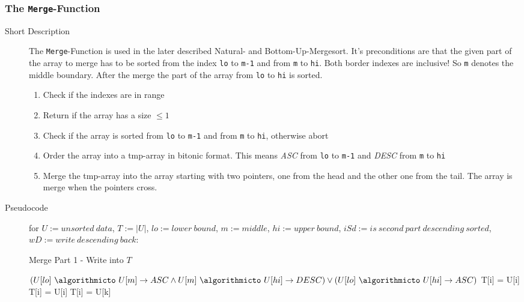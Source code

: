 \documentclass[11pt]{amsart}
\begin{document}
\subsubsection{The \texttt{Merge}-Function}
\begin{description}
	\item[Short Description] The \texttt{Merge}-Function is used in the later described Natural- and Bottom-Up-Mergesort. It's preconditions are that the given part of the array to merge has to be sorted from the index \texttt{lo} to \texttt{m-1} and from \texttt{m} to \texttt{hi}. Both border indexes are inclusive! So \texttt{m} denotes the middle boundary. After the merge the part of the array from \texttt{lo} to \texttt{hi} is sorted.
		\begin{enumerate}
			\item Check if the indexes are in range
			\item Return if the array has a size $\leq 1$
			\item Check if the array is sorted from \texttt{lo} to \texttt{m-1} and from \texttt{m} to \texttt{hi}, otherwise abort
			\item Order the array into a tmp-array in bitonic format. This means \textit{ASC} from \texttt{lo} to \texttt{m-1} and \textit{DESC} from \texttt{m} to \texttt{hi}
			\item Merge the tmp-array into the array starting with two pointers, one from the head and the other one from the tail. The array is merge when the pointers cross.
		\end{enumerate}
	\item[Pseudocode] for $U := unsorted~data$, $T := |U|$, $lo := lower~bound$, $m := middle$, $hi :=upper~bound$, $iSd := is~second~part~descending~sorted$, $wD := write~descending~back$:
	\begin{algorithm}
	\caption{Merge Part 1 - Write into $T$}
		\begin{algorithmic}[1]
		\Require $(U[lo]~\algorithmicto~U[m] \to ASC \land U[m]~\algorithmicto~U[hi] \to DESC) \lor (U[lo]~\algorithmicto~U[hi] \to ASC)$
				 \State T[i] = U[i] \EndFor
			\Else{}
				 \State T[i] = U[i] \EndFor
				 \State T[i] = U[k] \EndFor
			\EndIf
		\end{algorithmic}

\end{algorithm}
\end{description}
\end{document}
